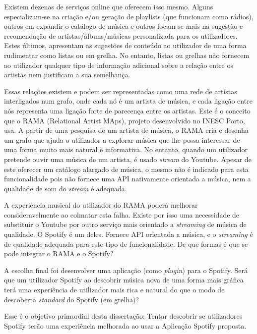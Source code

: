 Existem dezenas de serviços online que oferecem isso mesmo.
Alguns especializam-se na criação e/ou geração de playlists (que funcionam como rádios), outros em expandir o catálogo de música e outros focam-se mais na sugestão e recomendação de artistas/álbuns/músicas personalizada para os utilizadores.
Estes últimos, apresentam as sugestões de conteúdo ao utilizador de uma forma rudimentar como listas ou em grelha.
No entanto, listas ou grelhas não fornecem ao utilizador qualquer tipo de informação adicional sobre a relação entre os artistas nem justificam a sua semelhança.

Essas relações existem e podem ser representadas como uma rede de artistas interligados num grafo, onde cada nó é um artista de música, e cada ligação entre nós representa uma ligação forte de parecença entre os artistas.
Este é o conceito que o RAMA (Relational Artist MAps), projeto desenvolvido no INESC Porto, usa.
A partir de uma pesquisa de um artista de música, o RAMA cria e desenha um grafo que ajuda o utilizador a explorar música que lhe possa interessar de uma forma muito mais natural e informativa.
No entanto, quando um utilizador pretende ouvir uma música de um artista, é usado \emph{stream} do Youtube. 
Apesar de este oferecer um catálogo alargado de música, o mesmo não é indicado para esta funcionalidade pois não fornece uma API nativamente orientada a música, nem a qualidade de som do \emph{stream} é adequada.

A experiência musical do utilizador do RAMA poderá melhorar consideravelmente ao colmatar esta falha.
Existe por isso uma necessidade de substituir o Youtube por outro serviço mais orientado a \emph{streaming} de música de qualidade.
O Spotify é um deles. Fornece API orientada a música, e o \emph{streaming} é de qualidade adequada para este tipo de funcionalidade.
De que formas é que se pode integrar o RAMA e o Spotify?

A escolha final foi desenvolver uma aplicação (como \emph{plugin}) para o Spotify.
Será que um utilizador Spotify ao descobrir música nova de uma forma mais gráfica terá uma experiência de utilizador mais rica e natural do que o modo de descoberta \emph{standard} do Spotify (em grelha)?

Esse é o objetivo primordial desta dissertação: Tentar descobrir se utilizadores Spotify terão uma experiência melhorada ao usar a Aplicação Spotify proposta.
